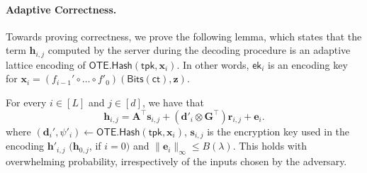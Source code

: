 \documentclass{theoretics}
\newcommand{\ek}{\mathsf{ek}}
\newcommand{\OTE}{\mathsf{OTE}}
\renewcommand{\sec}{\ensuremath{\lambda}}
\newcommand{\ct}{\mathsf{ct}}
\newcommand{\algofont}[1]{\ensuremath{\mathsf{#1}}}
\newcommand{\tpk}{{\algofont{tpk}}}
\newcommand{\Hash}{{\algofont{Hash}}}
\begin{document}
    \paragraph{Adaptive Correctness.} Towards proving correctness, we prove the following lemma, which states that the term $\mathbf{h}_{i, j}$ computed by the server during the decoding procedure is an adaptive lattice encoding of $\OTE.\Hash(\tpk, \mathbf{x}_i)$. In other words, $\ek_i$ is an encoding key for $\mathbf{x}_i=(f_{i-1}'\circ\dots\circ f'_0)(\mathsf{Bits}(\ct), \mathbf{z})$.
\begin{lemma}
\label{claimboh}
For every $i\in[L]$ and $j\in[d]$, we have that
\[ \mathbf{h}_{i,j}=\mathbf{A}^\intercal \mathbf{s}_{i,j}+(\mathbf{d}'_i\otimes \mathbf{G}^\intercal)\mathbf{r}_{i,j}+\mathbf e_i. \]
where $(\mathbf{d}_i', \psi'_i)\gets\OTE.\Hash(\tpk, \mathbf{x}_i)$, $\mathbf{s}_{i, j}$ is the encryption key used in the encoding $\mathbf{h}'_{i, j}$ $(\mathbf{h}_{0, j}$, if $i=0)$ and $\lVert \mathbf{e}_i\rVert_\infty\le B(\sec)$. {This holds with overwhelming probability, irrespectively of the inputs chosen by the adversary.}
\end{lemma}
\end{document}
